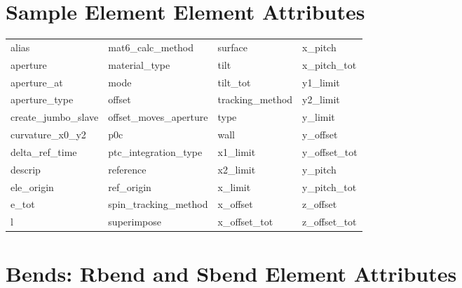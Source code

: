  \section{Sample Element Element Attributes}
 \label{s:list.sample}
 
 \begin{tabular}{llll} \toprule
alias                       & mat6_calc_method            & surface                     & x_pitch                     \\
aperture                    & material_type               & tilt                        & x_pitch_tot                 \\
aperture_at                 & mode                        & tilt_tot                    & y1_limit                    \\
aperture_type               & offset                      & tracking_method             & y2_limit                    \\
create_jumbo_slave          & offset_moves_aperture       & type                        & y_limit                     \\
curvature_x0_y2             & p0c                         & wall                        & y_offset                    \\
delta_ref_time              & ptc_integration_type        & x1_limit                    & y_offset_tot                \\
descrip                     & reference                   & x2_limit                    & y_pitch                     \\
ele_origin                  & ref_origin                  & x_limit                     & y_pitch_tot                 \\
e_tot                       & spin_tracking_method        & x_offset                    & z_offset                    \\
l                           & superimpose                 & x_offset_tot                & z_offset_tot                \\
 \bottomrule
 \end{tabular}
 \vfill
 
 \section{Bends: Rbend and Sbend Element Attributes}
 \label{s:list.bend}
 
